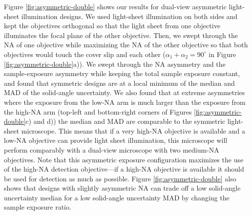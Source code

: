 \documentclass[10pt]{article}
\begin{document}
Figure \ref{fig:asymmetric-double} shows our results for dual-view asymmetric
light-sheet illumination designs. We used light-sheet illumination on both sides
and kept the objectives orthogonal so that the light sheet from one objective
illuminates the focal plane of the other objective. Then, we swept through the
NA of one objective while maximizing the NA of the other objective so that both
objectives would touch the cover slip and each other
($\alpha_1 + \alpha_2 = 90^{\circ}$ in Figure \ref{fig:asymmetric-double}a)). We
swept through the NA asymmetry and the sample-exposure asymmetry while keeping
the total sample exposure constant, and found that symmetric designs are at a
local minimum of the median and MAD of the solid-angle uncertainty. We also
found that at extreme asymmetries where the exposure from the low-NA arm is much
larger than the exposure from the high-NA arm (top-left and bottom-right corners
of Figures \ref{fig:asymmetric-double}c) and d)) the median and MAD are
comparable to the symmetric light-sheet microscope. This means that if a very
high-NA objective is available and a low-NA objective can provide light sheet
illumination, this microscope will perform comparably with a dual-view
microscope with two medium-NA objectives. Note that this asymmetric exposure
configuration maximizes the use of the high-NA detection objective---if a
high-NA objective is available it should be used for detection as much as
possible. Figure \ref{fig:asymmetric-double} also shows that designs with
slightly asymmetric NA can trade off a low solid-angle uncertainty median for a
low solid-angle uncertainty MAD by changing the sample exposure ratio.
\end{document}
